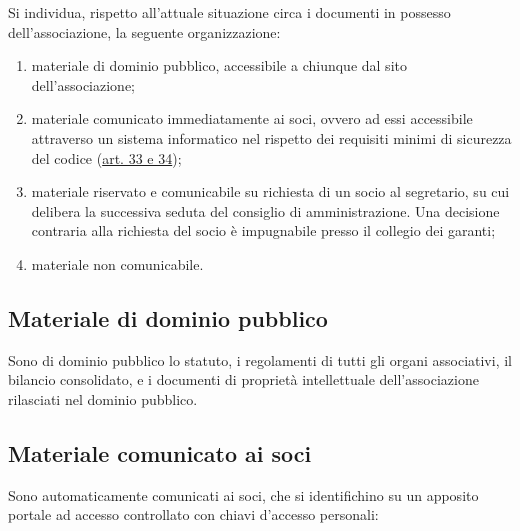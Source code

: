 Si individua, rispetto all'attuale situazione circa i documenti in
possesso dell'associazione, la seguente organizzazione:

\begin{enumerate}
    \item
        materiale di dominio pubblico, accessibile a chiunque dal sito
        dell'associazione;
    \item
        materiale comunicato immediatamente ai soci, ovvero ad essi
        accessibile attraverso un sistema informatico nel rispetto dei
        requisiti minimi di sicurezza del codice
        (\href{http://www.garanteprivacy.it/web/guest/home/docweb/-/docweb-display/docweb/1311248}{art.
        33 e 34});
    \item
        materiale riservato e comunicabile su richiesta di un socio al
        segretario, su cui delibera la successiva seduta del consiglio di
        amministrazione. Una decisione contraria alla richiesta del socio è
        impugnabile presso il collegio dei garanti;
    \item
        materiale non comunicabile.
\end{enumerate}

\subsection{Materiale di dominio pubblico}\label{materiale-di-dominio-pubblico}

Sono di dominio pubblico lo statuto, i regolamenti di tutti gli organi
associativi, il bilancio consolidato, e i documenti di proprietà
intellettuale dell'associazione rilasciati nel dominio pubblico.

\subsection{Materiale comunicato ai soci}\label{materiale-comunicato-ai-soci}

Sono automaticamente comunicati ai soci, che si identifichino su un apposito portale ad
accesso controllato con chiavi d'accesso personali:

